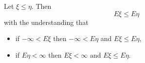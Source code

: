 Let $\xi \leq \eta$. Then
$$E\xi \leq E\eta$$
with the understanding that
\begin{itemize}
\item if $-\infty < E\xi$ then $-\infty < E\eta$ and $E\xi \leq E\eta$,
\item if $E\eta < \infty$ then $E\xi < \infty$ and $E\xi \leq E\eta$.
\end{itemize}
